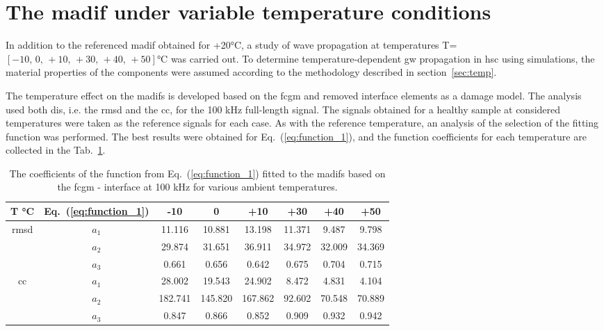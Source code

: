 \section{The \acs{madif} under variable temperature conditions}
\label{sec:madifTemp}

In addition to the referenced \ac{madif} obtained for +20\unit{\degreeCelsius}, a study of wave propagation at temperatures T=\(\left[-10,\,0,\,+10,\,+30,\,+40,\,+50\right]\)\unit{\degreeCelsius} was carried out.
To determine temperature-dependent \ac{gw} propagation in \ac{hsc} using simulations, the material properties of the components were assumed according to the methodology described in section~\ref{sec:temp}.

The temperature effect on the \acp{madif} is developed based on the \ac{fcgm} and removed interface elements as a damage model.
The analysis used both \acp{di}, i.e. the \ac{rmsd} and the \ac{cc}, for the 100 \unit{\kHz} full-length signal.
The signals obtained for a healthy sample at considered temperatures were taken as the reference signals for each case.
As with the reference temperature, an analysis of the selection of the fitting function was performed.
The best results were obtained for Eq.~(\ref{eq:function_1}), and the function coefficients for each temperature are collected in the Tab.~\ref{tab:fit_F_err_temp}.
\begin{table}[!tbh]
	\small
	\tabcolsep=0.25cm
	\centering
	\caption{\label{tab:fit_F_err_temp} The coefficients of the function from Eq.~(\ref{eq:function_1}) fitted to the \acfp{madif} based on the \acf{fcgm} - interface at 100 \unit{\kHz} for various ambient temperatures.}
	\begin{tabular}{cccccccc}
		\toprule
		{T \unit{\degreeCelsius}} & Eq.~(\ref{eq:function_1}) & -10 & 0 & +10 & +30 & +40 & +50\\
		\midrule
		\multirow{3}{*}{\ac{rmsd}} & $a_1$ & 11.116 & 10.881 & 13.198 & 11.371 & 9.487 & 9.798\\
		 & $a_2$ & 29.874 & 31.651 & 36.911 & 34.972 & 32.009 & 34.369\\
		 & $a_3$ & 0.661 & 0.656 & 0.642 & 0.675 & 0.704 & 0.715\\
		\midrule
		\multirow{3}{*}{\ac{cc}} & $a_1$ & 28.002 & 19.543 & 24.902 & 8.472 & 4.831 & 4.104\\
		& $a_2$ & 182.741 & 145.820 & 167.862 & 92.602 & 70.548 & 70.889\\
		& $a_3$ & 0.847 & 0.866 & 0.852 & 0.909 & 0.932 & 0.942\\
		\bottomrule
	\end{tabular}
\end{table}


